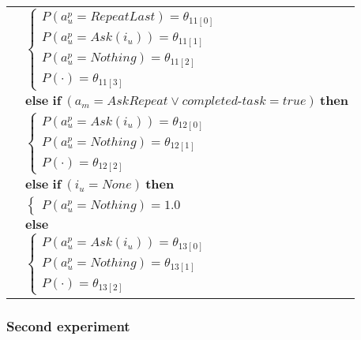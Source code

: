 \begin{footnotesize}
\begin{longtable}{p{1cm}p{14cm}}
& \;\;\;\;\; $ \begin{cases}P(\mathit{a_u^p}\!=\!\mathit{RepeatLast})\!=\!\theta_{\mathrm{11[0]}} \\
P(\mathit{a_u^p}\!=\!\mathit{Ask({i_u})})\!=\!\theta_{\mathrm{11[1]}} \\
P(\mathit{a_u^p}\!=\!\mathit{Nothing})\!=\!\theta_{\mathrm{11[2]}} \\
P(\cdot)\!=\!\theta_{\mathrm{11[3]}} \end{cases}$\\[3mm] & $ \textbf{else if} \ (\mathit{a_m}\!=\!\mathit{AskRepeat} \lor \mathit{completed\mbox{-}task}\!=\!\mathit{true}) \ \textbf{then}$ \\
& \;\;\;\;\; $ \begin{cases}P(\mathit{a_u^p}\!=\!\mathit{Ask({i_u})})\!=\!\theta_{\mathrm{12[0]}} \\
P(\mathit{a_u^p}\!=\!\mathit{Nothing})\!=\!\theta_{\mathrm{12[1]}} \\
P(\cdot)\!=\!\theta_{\mathrm{12[2]}} \end{cases}$\\[3mm] & $ \textbf{else if} \ (\mathit{i_u}\!=\!\mathit{None}) \ \textbf{then}$ \\
& \;\;\;\;\; $ \begin{cases}P(\mathit{a_u^p}\!=\!\mathit{Nothing})\!=\!1.0 \end{cases}$\\[3mm] & $ \textbf{else}$ \\
& \;\;\;\;\; $ \begin{cases}P(\mathit{a_u^p}\!=\!\mathit{Ask({i_u})})\!=\!\theta_{\mathrm{13[0]}} \\
P(\mathit{a_u^p}\!=\!\mathit{Nothing})\!=\!\theta_{\mathrm{13[1]}} \\
P(\cdot)\!=\!\theta_{\mathrm{13[2]}} \end{cases}$ 
\end{longtable}
\end{footnotesize}

\subsubsection*{Second experiment}

